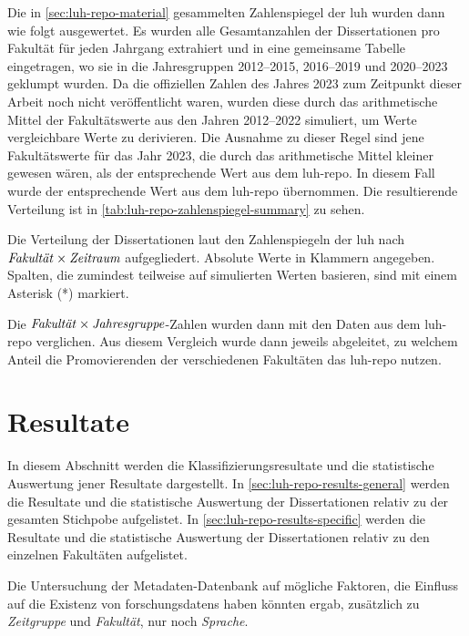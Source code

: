 Die in \cref{sec:luh-repo-material} gesammelten Zahlenspiegel der \gls{luh} wurden dann wie folgt ausgewertet.
Es wurden alle Gesamtanzahlen der Dissertationen pro Fakultät für jeden Jahrgang extrahiert und in eine gemeinsame Tabelle eingetragen, wo sie in die Jahresgruppen 2012--2015, 2016--2019 und 2020--2023 geklumpt wurden.
Da die offiziellen Zahlen des Jahres 2023 zum Zeitpunkt dieser Arbeit noch nicht veröffentlicht waren, wurden diese durch das arithmetische Mittel der Fakultätswerte aus den Jahren 2012--2022 simuliert, um Werte vergleichbare Werte zu derivieren.
Die Ausnahme zu dieser Regel sind jene Fakultätswerte für das Jahr 2023, die durch das arithmetische Mittel kleiner gewesen wären, als der entsprechende Wert aus dem \gls{luh-repo}.
In diesem Fall wurde der entsprechende Wert aus dem \gls{luh-repo} übernommen.
Die resultierende Verteilung ist in \cref{tab:luh-repo-zahlenspiegel-summary} zu sehen.
\begin{table}[!htbp]
	\caption{Die Verteilung der Dissertationen laut den Zahlenspiegeln der \gls{luh} nach $\text{\textit{Fakultät}}\times\text{\textit{Zeitraum}}$ aufgegliedert.
    Absolute Werte in Klammern angegeben.
    Spalten, die zumindest teilweise auf simulierten Werten basieren, sind mit einem Asterisk (*) markiert.}
    
	\label{tab:luh-repo-zahlenspiegel-summary}
\end{table}
Die $\text{\textit{Fakultät}}\times\text{\textit{Jahresgruppe}}$-Zahlen wurden dann mit den Daten aus dem \gls{luh-repo} verglichen.
Aus diesem Vergleich wurde dann jeweils abgeleitet, zu welchem Anteil die Promovierenden der verschiedenen Fakultäten das \gls{luh-repo} nutzen.

\section{Resultate}\label{sec:luh-repo-results}
In diesem Abschnitt werden die Klassifizierungsresultate und die statistische Auswertung jener Resultate dargestellt.
In \cref{sec:luh-repo-results-general} werden die Resultate und die statistische Auswertung der Dissertationen relativ zu der gesamten Stichpobe aufgelistet.
In \cref{sec:luh-repo-results-specific} werden die Resultate und die statistische Auswertung der Dissertationen relativ zu den einzelnen Fakultäten aufgelistet.

Die Untersuchung der Metadaten-Datenbank auf mögliche Faktoren, die Einfluss auf die Existenz von \glspl{forschungsdaten} haben könnten ergab, zusätzlich zu \textit{Zeitgruppe} und \textit{Fakultät}, nur noch \textit{Sprache}.

